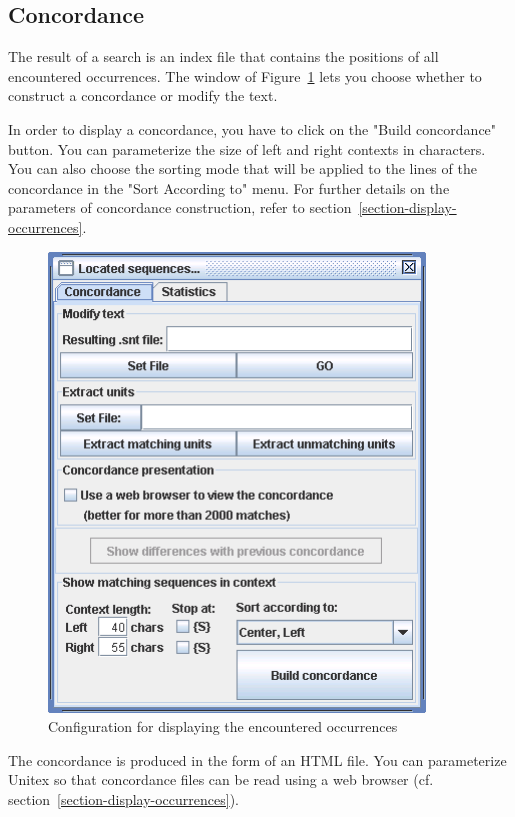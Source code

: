 \subsection{Concordance}
The result of a search is an index file that contains the positions of all
encountered occurrences.
The window of Figure~\ref{fig-configuration-display-occurrences} lets you
choose whether to construct a concordance or modify the text.

\bigskip
{}
\noindent In order to display a concordance, you have to click on the "Build
concordance" button. You can parameterize the size of left and right contexts in characters.
You can also choose the sorting mode that will be applied to the lines of the
concordance in the "Sort According to" menu. For further details on the
parameters of concordance construction, refer to
section~\ref{section-display-occurrences}.
\begin{figure}[h]
\begin{center}
\includegraphics[width=10cm]{resources/img/fig6-31.png}
\caption{Configuration for displaying the encountered occurrences
\label{fig-configuration-display-occurrences}}
\end{center}
\end{figure}
\noindent The concordance is produced in the form of an HTML file.
 You can parameterize Unitex  so that concordance files 
can be read using a web browser
(cf. section~\ref{section-display-occurrences}).


